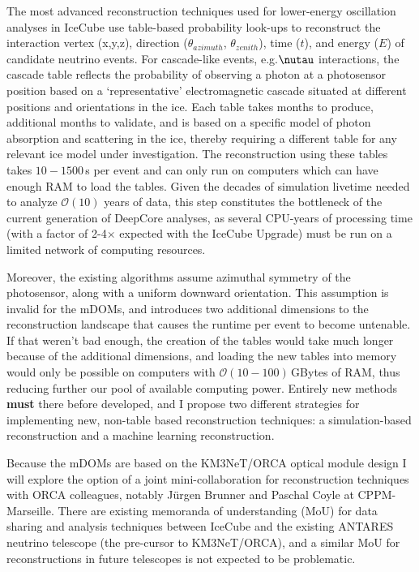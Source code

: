 \documentclass[a4paper,11pt]{article}
\begin{document}
The most advanced reconstruction techniques used for lower-energy oscillation analyses in IceCube use table-based probability look-ups to reconstruct the interaction vertex (x,y,z), direction ($\theta_{azimuth}$, $\theta_{zenith}$), time ($t$), and energy ($E$) of candidate neutrino events. For cascade-like events, e.g.\@ $\nutau$ interactions, the cascade table reflects the probability of observing a photon at a photosensor position based on a `representative' electromagnetic cascade situated at different positions and orientations in the ice. Each table takes months to produce, additional months to validate, and is based on a specific model of photon absorption and scattering in the ice, thereby requiring a different table for any relevant ice model under investigation. The reconstruction using these tables takes $10-1500$\,s per event and can only run on computers which can have enough RAM to load the tables. Given the decades of simulation livetime needed to analyze $\mathcal{O}(10)$ years of data, this step constitutes the bottleneck of the current generation of DeepCore analyses, as several CPU-years of processing time (with a factor of 2-4$\times$ expected with the IceCube Upgrade) must be run on a limited network of computing resources.

Moreover, the existing algorithms assume azimuthal symmetry of the photosensor, along with a uniform downward orientation. This assumption is invalid for the mDOMs, and introduces two additional dimensions to the reconstruction landscape that causes the runtime per event to become untenable. If that weren't bad enough, the creation of the tables would take much longer because of the additional dimensions, and loading the new tables into memory would only be possible on computers with $\mathcal{O}(10-100)$\,GBytes of RAM, thus reducing further our pool of available computing power. Entirely new methods \textbf{must} there before developed, and I propose two different strategies for implementing new, non-table based reconstruction techniques: a simulation-based reconstruction and a machine learning reconstruction.

Because the mDOMs are based on the KM3NeT/ORCA\cite{Adrian-Martinez:2016fdl} optical module design I will explore the option of a joint mini-collaboration for reconstruction techniques with ORCA colleagues, notably Jürgen Brunner and Paschal Coyle at CPPM-Marseille. There are existing memoranda of understanding (MoU) for data sharing and analysis techniques between IceCube and the existing ANTARES neutrino telescope (the pre-cursor to KM3NeT/ORCA), and a similar MoU for reconstructions in future telescopes is not expected to be problematic.
\end{document}
